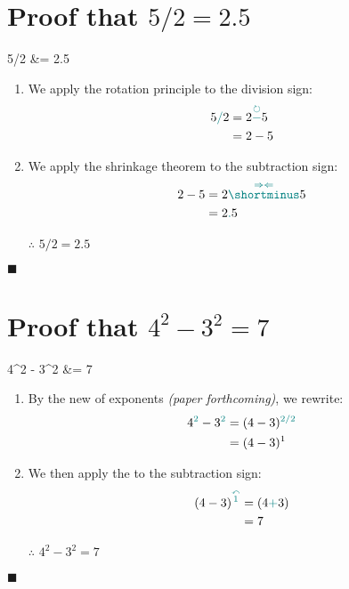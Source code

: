 \documentclass[12pt, titlepage,french]{article}
\begin{document}
\clearpage

\section{Proof that $5/2	=	2.5$}

\begin{theorems}[Theorem]
	5/2
	&=	2.5
\end{theorems}

\begin{distributions}[Proof]
\begin{enumerate}
	\item	We apply the rotation principle to the division sign:
		\begin{align*}
		5{\color{teal}/}2
		&=	2{\color{teal} \overset{\circlearrowright}{-}}5	\\
		&=	2	-	5
		\end{align*}
	\item	We apply the shrinkage theorem to the subtraction sign:
		\begin{align*}
		2	-	5
		&=	2	{\color{teal}\overset{\Rightarrow\Leftarrow}{\shortminus}}	5	\\
		&=	2{\color{teal}.}5
		\end{align*}
	\item[$\therefore$]	$5/2	=	2.5$
\end{enumerate}
\end{distributions}
$\blacksquare$

\clearpage

\section{Proof that $4^{2}	-	3^{2}	=	7$}

\begin{theorems}[Theorem]
	4^{2}	-	3^{2}	
	&=	7
\end{theorems}

\begin{distributions}[Proof]
\begin{enumerate}
	\item	By the new  of exponents \textit{(paper forthcoming)}, we rewrite:
		\begin{align*}
		4^{\color{teal}2}	-	3^{\color{teal}2}	
		&=	(4	-	3)^{\color{teal}2/2}		\\
		&=	(4	-	3)^{1}		
		\end{align*}
	\item	We then apply the  to the subtraction sign:
		\begin{align*}
		(4	-	3)^{\color{teal}\overset{\curvearrowleft}{1}}
		&=	(4	{\color{teal}+}	3)	\\
		&=	7
		\end{align*}
	\item[$\therefore$]	$4^{2}	-	3^{2}	=	7$
\end{enumerate}
\end{distributions}
$\blacksquare$
\end{document}
